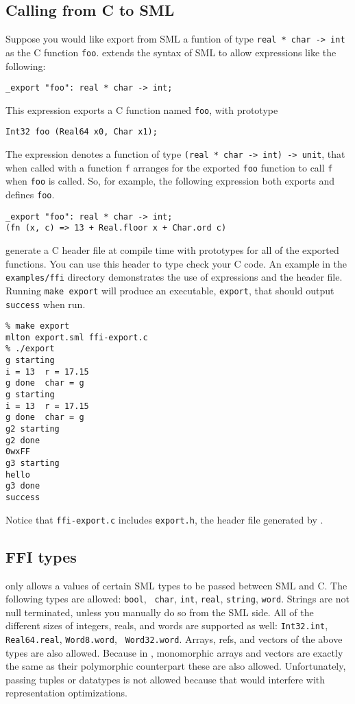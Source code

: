 \subsection{Calling from C to SML}
Suppose you would like export from SML a funtion of type {\tt real *
char -> int} as the C function {\tt foo}.  {\mlton} extends the syntax
of SML to allow expressions like the following:
\begin{verbatim}
_export "foo": real * char -> int;
\end{verbatim}
This expression exports a C function named {\tt foo}, with prototype
\begin{verbatim}
Int32 foo (Real64 x0, Char x1);
\end{verbatim}
The {\export} expression denotes a function of type {\tt (real * char
-> int) -> unit}, that when called with a function {\tt f} arranges
for the exported {\tt foo} function to call {\tt f} when {\tt foo} is
called.  So, for example, the following expression both exports and
defines {\tt foo}.
\begin{verbatim}
_export "foo": real * char -> int;
(fn (x, c) => 13 + Real.floor x + Char.ord c)
\end{verbatim}

{\mlton} generate a C header file at compile time with prototypes for
all of the exported functions.  You can use this header to type check
your C code.  An example in the {\tt examples/ffi} directory
demonstrates the use of {\export} expressions and the header file.
Running {\tt make export} will produce an executable, {\tt export},
that should output {\tt success} when run.

\begin{verbatim}
% make export
mlton export.sml ffi-export.c
% ./export
g starting
i = 13  r = 17.15
g done  char = g
g starting
i = 13  r = 17.15
g done  char = g
g2 starting
g2 done
0wxFF
g3 starting
hello
g3 done
success
\end{verbatim}

Notice that {\tt ffi-export.c} includes {\tt export.h}, the header
file generated by {\mlton}.

\subsection{FFI types}

{\mlton} only allows a values of certain SML types to be passed
between SML and C.  The following types are allowed: {\tt bool}, {\tt
char}, {\tt int}, {\tt real}, {\tt string}, {\tt word}.  Strings are
not null terminated, unless you manually do so from the SML side.  All
of the different sizes of integers, reals, and words are supported as
well: {\tt Int32.int}, {\tt Real64.real}, {\tt Word8.word}, {\tt
Word32.word}.  Arrays, refs, and vectors of the above types are also
allowed.  Because in {\mlton}, monomorphic arrays and vectors are
exactly the same as their polymorphic counterpart these are also
allowed.  Unfortunately, passing tuples or datatypes is not allowed
because that would interfere with representation optimizations.

